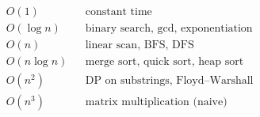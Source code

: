 \[
\begin{aligned}
& O(1) && \text{constant time} \\
& O(\log n) && \text{binary search, gcd, exponentiation} \\
& O(n) && \text{linear scan, BFS, DFS} \\
& O(n \log n) && \text{merge sort, quick sort, heap sort} \\
& O(n^2) && \text{DP on substrings, Floyd–Warshall} \\
& O(n^3) && \text{matrix multiplication (naive)} \\
\end{aligned}
\]